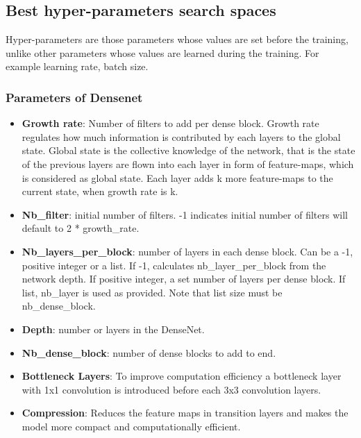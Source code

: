 \subsection{Best hyper-parameters search spaces}
Hyper-parameters are those parameters whose values are set before the training, unlike other parameters whose values are learned during the training. 
For example learning rate, batch size. \cite{wikihyper}

\subsubsection{Parameters of Densenet}
\begin{itemize}
  \item \textbf{Growth rate}: Number of filters to add per dense block. Growth rate regulates how much information is contributed by each layers to the global state. 
  Global state is the collective knowledge of the network, that is the state of the previous layers are flown into each layer in form of feature-maps, 
  which is considered as global state. Each layer adds k more feature-maps to the current state, when growth rate is k.

  \item \textbf{Nb\_filter}: initial number of filters. -1 indicates initial number of filters will default to 2 * growth\_rate.

  \item \textbf{Nb\_layers\_per\_block}: number of layers in each dense block. Can be a -1, positive integer or a list. If -1, calculates nb\_layer\_per\_block from the network depth. 
  If positive integer, a set number of layers per dense block. If list, nb\_layer is used as provided. Note that list size must be nb\_dense\_block.

  \item \textbf{Depth}: number or layers in the DenseNet.

  \item \textbf{Nb\_dense\_block}: number of dense blocks to add to end.

  \item \textbf{Bottleneck Layers}: To improve computation efficiency a bottleneck layer with 1x1 convolution is introduced before each 3x3 convolution layers. 
  \item \textbf{Compression}: Reduces the feature maps in transition layers and makes the model more compact and computationally efficient.
\end{itemize}



